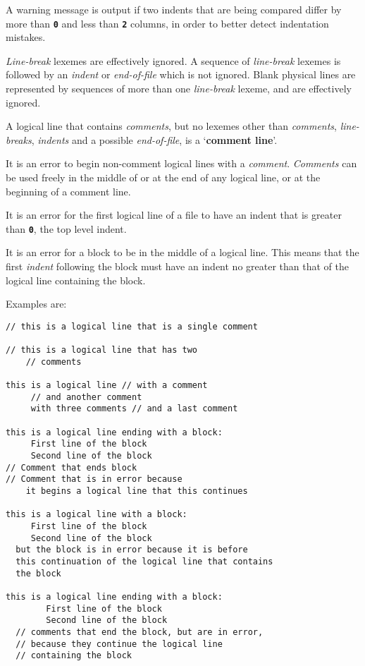 \documentclass[12pt]{article}
\newcommand{\TT}[1]{{\tt \bfseries #1}}
\newcommand{\key}[1]{{\rm \bfseries #1}}
\newenvironment{indpar}[1][0.3in]%
	{\begin{list}{}%
		     {\setlength{\itemsep}{0in}%
		      \setlength{\topsep}{0in}%
		      \setlength{\parsep}{1ex}%
		      \setlength{\labelwidth}{#1}%
		      \setlength{\leftmargin}{#1}%
		      \addtolength{\leftmargin}{\labelsep}}%
	 \item}%
	{\end{list}}
\begin{document}
A warning message is output if two indents that are being compared
differ by more than \TT{0} and
less than \TT{2} columns, in order to better detect
indentation mistakes.

{\em Line-break} lexemes are effectively ignored.  A sequence
of {\em line-break} lexemes is followed by an {\em indent}
or {\em end-of-file} which is not ignored.
Blank physical lines are represented by sequences of
more than one {\em line-break} lexeme, and are effectively
ignored.

A logical line that contains {\em comments}, but no
lexemes other than {\em comments}, {\em line-breaks}, {\em indents}
and a possible {\em end-of-file}, is
a `\key{comment line}'.

It is an error to begin non-comment logical lines with
a {\em comment}.
{\em Comments} can be used freely in the middle of or at the
end of any logical line, or at the beginning of a comment line.

It is an error for the first logical line of a file
to have an indent that is greater than \TT{0}, the top level
indent.

It is an error for a block to be in the middle of a logical
line.  This means that the first {\em indent} following the
block must have an indent no greater than that of the logical
line containing the block.

Examples are:
\begin{indpar}\begin{verbatim}
// this is a logical line that is a single comment

// this is a logical line that has two
    // comments

this is a logical line // with a comment
     // and another comment
     with three comments // and a last comment

this is a logical line ending with a block:
     First line of the block
     Second line of the block
// Comment that ends block
// Comment that is in error because
    it begins a logical line that this continues

this is a logical line with a block:
     First line of the block
     Second line of the block
  but the block is in error because it is before
  this continuation of the logical line that contains
  the block

this is a logical line ending with a block:
        First line of the block
        Second line of the block
  // comments that end the block, but are in error,
  // because they continue the logical line
  // containing the block
\end{verbatim}\end{indpar}
\end{document}
